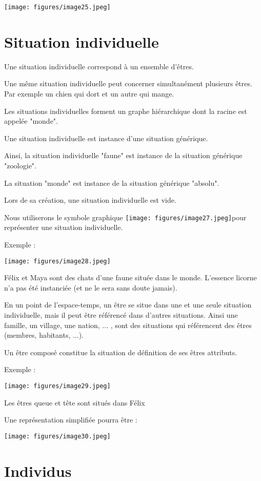 \documentclass[a4paper, 12pt, openright, french]{book}
\begin{document}
\texttt{[image: figures/image25.jpeg]}

\newpage
\section{Situation individuelle}

Une situation individuelle correspond à un ensemble
d'êtres.

Une même situation individuelle peut concerner simultanément plusieurs
êtres. Par exemple un chien qui dort et un autre qui mange.

Les situations individuelles forment un graphe hiérarchique dont la
racine est appelée "monde".

Une situation individuelle est instance d'une situation
générique.

Ainsi, la situation individuelle "faune" est instance de la situation
générique "zoologie".

La situation "monde" est instance de la situation générique "absolu".

Lors de sa création, une situation individuelle est vide.

Nous utiliserons le symbole graphique
\texttt{[image: figures/image27.jpeg]}pour
représenter une situation individuelle.

Exemple :

\texttt{[image: figures/image28.jpeg]}

Félix et Maya sont des chats d'une faune située dans le
monde. L'essence licorne n'a pas été
instanciée (et ne le sera sans doute jamais).

En un point de l'espace-temps, un être se situe dans une
et une seule situation individuelle, mais il peut être référencé dans
d'autres situations. Ainsi une famille, un village, une
nation, ... , sont des situations qui référencent des êtres (membres,
habitants, ...).

Un être composé constitue la situation de définition de ses êtres
attributs.

Exemple :

\texttt{[image: figures/image29.jpeg]}

Les êtres queue et tête sont situés dans Félix

Une représentation simplifiée pourra être :

\texttt{[image: figures/image30.jpeg]}


\section{Individus}
\end{document}
